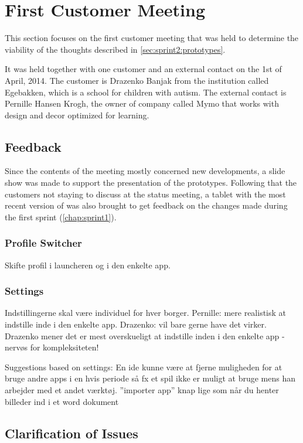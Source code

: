 \section{First Customer Meeting}\label{sec:sprint2:firstmeeting}
This section focuses on the first customer meeting that was held to determine the viability of the thoughts described in \cref{sec:sprint2:prototypes}.

It was held together with one customer and an external contact on the 1st of April, 2014.
The customer is Drazenko Banjak from the institution called Egebakken, which is a school for children with autism.
The external contact is Pernille Hansen Krogh, the owner of company called Mymo that works with design and decor optimized for learning.


\subsection{Feedback}
Since the contents of the meeting mostly concerned new developments, a slide show was made to support the presentation of the prototypes.
Following that the customers not staying to discuss \giraf at the status meeting, a tablet with the most recent version of \launcher was also brought to get feedback on the changes made during the first sprint (\cref{chap:sprint1}).

\subsubsection{Profile Switcher}

Skifte profil i launcheren og i den enkelte app.

\subsubsection{Settings}
Indstillingerne skal være individuel for hver borger. 
Pernille: mere realistisk at indstille inde i den enkelte app.
Drazenko: vil bare gerne have det virker. 
Drazenko mener det er mest overskueligt at indstille inden i den enkelte app - nervøs for kompleksiteten!

Suggestions based on settings:
En ide kunne være at fjerne muligheden for at bruge andre apps i en hvis periode så fx et spil ikke
er muligt at bruge mens han arbejder med et andet værktøj.
”importer app” knap lige som når du henter billeder ind i et word
dokument


\subsection{Clarification of Issues}

